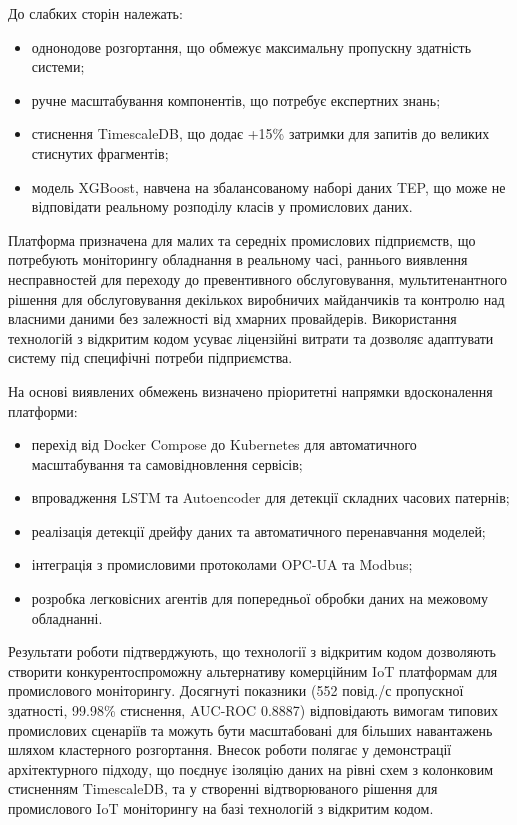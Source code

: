 До слабких сторін належать:

\begin{itemize}
    \item однонодове розгортання, що обмежує максимальну пропускну здатність системи;
    \item ручне масштабування компонентів, що потребує експертних знань;
    \item стиснення TimescaleDB, що додає +15\% затримки для запитів до великих стиснутих фрагментів;
    \item модель XGBoost, навчена на збалансованому наборі даних TEP, що може не відповідати реальному розподілу класів у промислових даних.
\end{itemize}

Платформа призначена для малих та середніх промислових підприємств, що потребують моніторингу обладнання в реальному часі, раннього виявлення несправностей для переходу до превентивного обслуговування, мультитенантного рішення для обслуговування декількох виробничих майданчиків та контролю над власними даними без залежності від хмарних провайдерів. Використання технологій з відкритим кодом усуває ліцензійні витрати та дозволяє адаптувати систему під специфічні потреби підприємства.

На основі виявлених обмежень визначено пріоритетні напрямки вдосконалення платформи:

\begin{itemize}
    \item перехід від Docker Compose до Kubernetes для автоматичного масштабування та самовідновлення сервісів;
    \item впровадження LSTM та Autoencoder для детекції складних часових патернів;
    \item реалізація детекції дрейфу даних та автоматичного перенавчання моделей;
    \item інтеграція з промисловими протоколами OPC-UA та Modbus;
    \item розробка легковісних агентів для попередньої обробки даних на межовому обладнанні.
\end{itemize}

Результати роботи підтверджують, що технології з відкритим кодом дозволяють створити конкурентоспроможну альтернативу комерційним IoT платформам для промислового моніторингу. Досягнуті показники (552 повід./с пропускної здатності, 99.98\% стиснення, AUC-ROC 0.8887) відповідають вимогам типових промислових сценаріїв та можуть бути масштабовані для більших навантажень шляхом кластерного розгортання. Внесок роботи полягає у демонстрації архітектурного підходу, що поєднує ізоляцію даних на рівні схем з колонковим стисненням TimescaleDB, та у створенні відтворюваного рішення для промислового IoT моніторингу на базі технологій з відкритим кодом.


